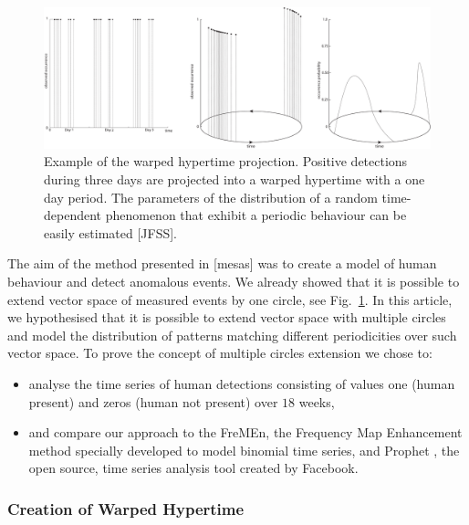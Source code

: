 \begin{figure}[!t]
\begin{center}
    \includegraphics[width=1.0\columnwidth]{fig/hypertime_graph}
    \caption{Example of the warped hypertime projection. Positive detections during three days are projected into a warped hypertime with a one day period. The parameters of the distribution of a random time-dependent phenomenon that exhibit a periodic behaviour can be easily estimated [JFSS].\label{fig:hypertime}}

\end{center}
\end{figure}



The aim of the method presented in [mesas] was to create a model of human behaviour and detect anomalous events. 
We already showed that it is possible to extend vector space of measured events by one circle, see Fig.~\ref{fig:hypertime}.
In this article, we hypothesised that it is possible to extend vector space with multiple circles and model the distribution of patterns matching different periodicities over such vector space.
To prove the concept of multiple circles extension we chose to: 
\begin{itemize}
    \item analyse the time series of human detections consisting of values one (human present) and zeros (human not present) over $18$ weeks, 
    \item and compare our approach to the FreMEn, the Frequency Map Enhancement method \cite{krajnik2017fremen} specially developed to model binomial time series, and Prophet \cite{taylor2018forecasting}, the open source, time series analysis tool created by Facebook.
\end{itemize}

\subsubsection{Creation of Warped Hypertime}\label{sec:whyte}

